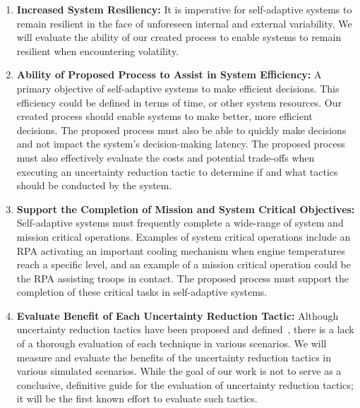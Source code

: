 \documentclass[12pt]{article}
\begin{document}
\begin{enumerate}[noitemsep]

  	\item \textbf{Increased System Resiliency: }It is imperative for self-adaptive systems to remain resilient in the face of unforeseen internal and external variability. We will evaluate the ability of our created process to enable systems to remain resilient when encountering volatility.



     \item \textbf{Ability of Proposed Process to Assist in  System Efficiency: }A primary objective of self-adaptive systems to make efficient decisions. This efficiency could be defined in terms of time, or other system resources. Our created process should enable systems to make better, more efficient decisions. The proposed process must also be able to quickly make decisions and not impact the system's decision-making latency. The proposed process must also effectively evaluate the costs and potential trade-offs when executing an uncertainty reduction tactic to determine if and what tactics should be conducted by the system.

    \item \textbf{Support the Completion of Mission and System Critical Objectives: }Self-adaptive systems must frequently complete a wide-range of system and mission critical operations. Examples of system critical operations include an RPA activating an important cooling mechanism when engine temperatures reach a specific level, and an example of a mission critical operation could be the RPA assisting troops in contact. The proposed process must support the completion of these critical tasks in self-adaptive systems.

   \item \textbf{Evaluate Benefit of Each Uncertainty Reduction Tactic: }Although uncertainty reduction tactics have been proposed and defined~\cite{moreno2018uncertainty}, there is a lack of a thorough evaluation of each technique in various scenarios. We will measure and evaluate the benefits of the uncertainty reduction tactics in various simulated scenarios. While the goal of our work is not to serve as a conclusive, definitive guide for the evaluation of uncertainty reduction tactics; it will be the first known effort to evaluate such tactics.

\end{enumerate}
\end{document}
